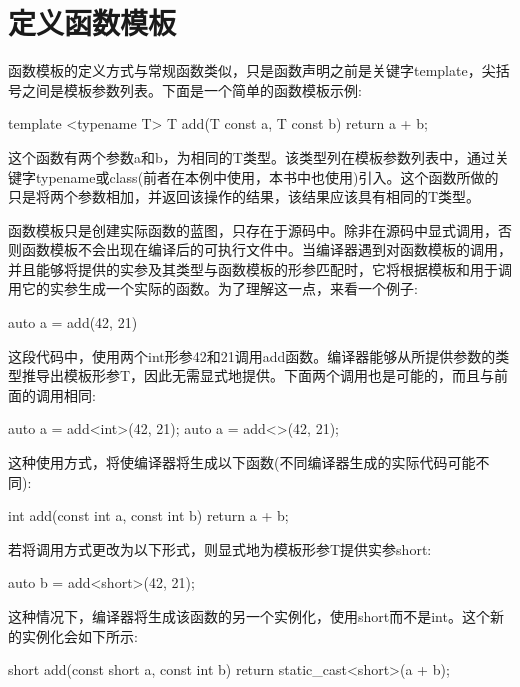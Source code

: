 \section{定义函数模板}
函数模板的定义方式与常规函数类似，只是函数声明之前是关键字template，尖括号之间是模板参数列表。下面是一个简单的函数模板示例:

\begin{cpp}
template <typename T>
T add(T const a, T const b)
{
	return a + b;
}
\end{cpp}

这个函数有两个参数a和b，为相同的T类型。该类型列在模板参数列表中，通过关键字typename或class(前者在本例中使用，本书中也使用)引入。这个函数所做的只是将两个参数相加，并返回该操作的结果，该结果应该具有相同的T类型。

函数模板只是创建实际函数的蓝图，只存在于源码中。除非在源码中显式调用，否则函数模板不会出现在编译后的可执行文件中。当编译器遇到对函数模板的调用，并且能够将提供的实参及其类型与函数模板的形参匹配时，它将根据模板和用于调用它的实参生成一个实际的函数。为了理解这一点，来看一个例子:

\begin{cpp}
auto a = add(42, 21)
\end{cpp}

这段代码中，使用两个int形参42和21调用add函数。编译器能够从所提供参数的类型推导出模板形参T，因此无需显式地提供。下面两个调用也是可能的，而且与前面的调用相同:

\begin{cpp}
auto a = add<int>(42, 21);
auto a = add<>(42, 21);
\end{cpp}

这种使用方式，将使编译器将生成以下函数(不同编译器生成的实际代码可能不同):

\begin{cpp}
int add(const int a, const int b)
{
	return a + b;
}
\end{cpp}

若将调用方式更改为以下形式，则显式地为模板形参T提供实参short:

\begin{cpp}
auto b = add<short>(42, 21);
\end{cpp}

这种情况下，编译器将生成该函数的另一个实例化，使用short而不是int。这个新的实例化会如下所示:

\begin{cpp}
short add(const short a, const int b)
{
	return static_cast<short>(a + b);
}
\end{cpp}

